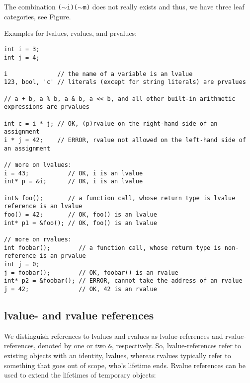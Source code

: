 The combination \texttt{($\sim$i)($\sim$m)} does not really exists and thus, we have three leaf categories, see Figure.

Examples for lvalues, rvalues, and prvalues:
\begin{verbatim}
int i = 3;
int j = 4;

i              // the name of a variable is an lvalue
123, bool, 'c' // literals (except for string literals) are prvalues

// a + b, a % b, a & b, a << b, and all other built-in arithmetic expressions are prvalues

int c = i * j; // OK, (p)rvalue on the right-hand side of an assignment
i * j = 42;    // ERROR, rvalue not allowed on the left-hand side of an assignment

// more on lvalues:
i = 43;           // OK, i is an lvalue
int* p = &i;      // OK, i is an lvalue

int& foo();       // a function call, whose return type is lvalue reference is an lvalue
foo() = 42;       // OK, foo() is an lvalue
int* p1 = &foo(); // OK, foo() is an lvalue

// more on rvalues:
int foobar();        // a function call, whose return type is non-reference is an prvalue
int j = 0;
j = foobar();        // OK, foobar() is an rvalue
int* p2 = &foobar(); // ERROR, cannot take the address of an rvalue
j = 42;              // OK, 42 is an rvalue
\end{verbatim}


\subsection{lvalue- and rvalue references}
We distinguish references to lvalues and rvalues as lvalue-references and rvalue-references, denoted by one or two \texttt{\&}, respectively. So,
lvalue-references refer to existing objects with an identity, \ie lvalues, whereas rvalues typically refer to something that goes out of scope, who's
lifetime ends. Rvalue references can be used to extend the lifetimes of temporary objects:

